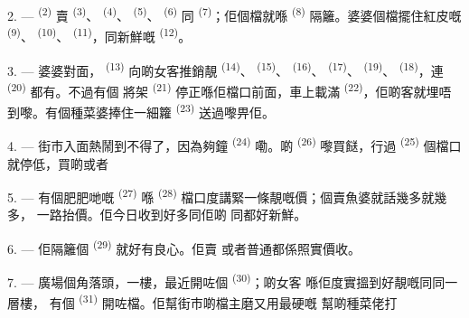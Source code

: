 2. ---  \textsuperscript{(2)} 賣 \textsuperscript{(3)}、
 \textsuperscript{(4)}、 \textsuperscript{(5)}、
\textsuperscript{(6)} 同 \textsuperscript{(7)}；佢個檔就喺
 \textsuperscript{(8)} 隔籬。婆婆個檔擺住紅皮嘅
 \textsuperscript{(9)}、 \textsuperscript{(10)}、
 \textsuperscript{(11)}，同新鮮嘅 \textsuperscript{(12)}。

3. --- 婆婆對面， \textsuperscript{(13)} 向啲女客推銷靚
\textsuperscript{(14)}、 \textsuperscript{(15)}、 \textsuperscript{(16)}、
 \textsuperscript{(17)}、 \textsuperscript{(19)}、
\textsuperscript{(18)}，連 \textsuperscript{(20)} 都有。不過有個
將架 \textsuperscript{(21)} 停正喺佢檔口前面，車上載滿
 \textsuperscript{(22)}，佢啲客就埋唔到嚟。有個種菜婆捧住一細籮
 \textsuperscript{(23)} 送過嚟畀佢。

\VUsaut{4.0mm}
\VUsaut{3.0mm}

4. --- 街市入面熱鬧到不得了，因為夠鐘 \textsuperscript{(24)} 嘞。啲
 \textsuperscript{(26)} 嚟買餸，行過 \textsuperscript{(25)} 個檔口
就停低，買啲或者

5. --- 有個肥肥哋嘅 \textsuperscript{(27)} 喺
\textsuperscript{(28)} 檔口度講緊一條靚嘅價；個賣魚婆就話幾多就幾多，
一路抬價。佢今日收到好多同佢啲
同都好新鮮。

\VUsaut{4.0mm}
\VUsaut{3.0mm}

6. --- 佢隔籬個 \textsuperscript{(29)} 就好有良心。佢賣
或者普通都係照實價收。

7. --- 廣場個角落頭，一樓，最近開咗個 \textsuperscript{(30)}；啲女客
喺佢度實搵到好靚嘅同同一層樓，
有個 \textsuperscript{(31)} 開咗檔。佢幫街市啲檔主磨又用最硬嘅
幫啲種菜佬打

\VUsaut{4.0mm}
\VUsaut{3.0mm}

